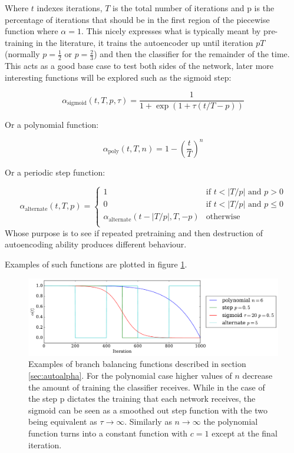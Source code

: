     Where $t$ indexes iterations, $T$ is the total number of iterations and p is the
    percentage of iterations that should be in the first region of the piecewise function
    where $\alpha=1$.
    This nicely expresses what is typically meant by pre-training in the literature, it trains
    the autoencoder up until iteration $pT$ (normally $p=\frac{1}{2}$ or $p=\frac{2}{3}$) and then the classifier for the remainder of the time.
    This acts as a good base case to test both sides of the network, later more interesting
    functions will be explored such as the sigmoid step:

    \begin{equation}
      \alpha_{\text{sigmoid}}(t,T,p,\tau) = \frac{1}{1 + \exp(1 + \tau (t/T - p))}
    \end{equation}

    Or a polynomial function:

    \begin{equation}
      \alpha_{\text{poly}}(t,T,n) = 1 - \left ( \frac{t}{T} \right )^n
    \end{equation}

    Or a periodic step function:

    \begin{equation}
      \alpha_{\text{alternate}}(t,T,p) =
      \begin{cases}
        1           & \text{if } t < |T/p| \text{ and } p > 0\\
        0           & \text{if } t < |T/p| \text{ and } p \leq 0\\
        \alpha_{\text{alternate}}(t-|T/p|,T,-p)           & \text{otherwise} \\
      \end{cases}
    \end{equation}
    Whose purpose is to see if repeated pretraining and then destruction of autoencoding ability
    produces different behaviour.

    Examples of such functions are plotted in figure \ref{fig:alpha_functions}.

    \begin{figure}[!h]
      \centering
      \includegraphics[width =\hsize]{figures/alpha.pdf}
      \caption{Examples of branch balancing functions described in section \ref{sec:autoalpha}.
      For the polynomial case higher values of $n$ decrease the amount of training
      the classifier receives. While in the case of the step p dictates the training
      that each network receives, the sigmoid can be seen as a smoothed out step function
      with the two being equivalent as $ \tau \rightarrow \infty$. Similarly as $n \rightarrow \infty$
      the polynomial function turns into a constant function with $c=1$ except at the final
      iteration.}
      \label{fig:alpha_functions}
    \end{figure}
